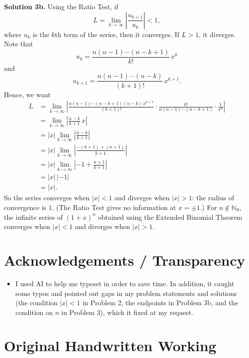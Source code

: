 \documentclass{article}
\begin{document}
\noindent\textbf{Solution 3b.} Using the Ratio Test, if
\[
    L = \lim_{k \to \infty} \left| \frac{u_{k+1}}{u_k} \right| < 1,
\]
where $u_k$ is the $k$th term of the series, then it converges. If $L > 1$, it diverges. Note that
\[
    u_k = \frac{n(n-1)\cdots(n-k+1)}{k!}\, x^k
\]
and
\[
    u_{k+1} = \frac{n(n-1)\cdots(n-k)}{(k+1)!}\, x^{k+1}.
\]
Hence, we want
\begin{align*}
    L &= \lim_{k \to \infty} \left| \frac{n(n-1)\cdots(n-k+1)(n-k)\, x^{k+1}}{(k+1)!} \cdot \frac{k!}{n(n-1)\cdots(n-k+1)} \cdot \frac{1}{x^k} \right| \\
      &= \lim_{k \to \infty} \left| \frac{n-k}{k+1}\, x \right| \\
      &= |x| \lim_{k \to \infty} \left| \frac{n-k}{k+1} \right| \\
      &= |x| \lim_{k \to \infty} \left| \frac{-(k+1) + (n+1)}{k+1} \right| \\
      &= |x| \lim_{k \to \infty} \left| -1 + \frac{n+1}{k+1} \right| \\
      &= |x|\,|-1| \\
      &= |x|.
\end{align*}
So the series converges when $|x| < 1$ and diverges when $|x| > 1$: the radius of convergence is $\boxed{1}$. (The Ratio Test gives no information at $x = \pm 1$.) For $n \notin \mathbb{N}_0$, the infinite series of $(1+x)^n$ obtained using the Extended Binomial Theorem converges when $|x| < 1$ and diverges when $|x| > 1$.

\section*{Acknowledgements / Transparency}

\begin{itemize}
    \item I used AI to help me typeset in order to save time. In addition, it caught some typos and pointed out gaps in my problem statements and solutions (the condition $|x| < 1$ in Problem 2, the endpoints in Problem 3b, and the condition on $n$ in Problem 3), which it fixed at my request.
\end{itemize}

\clearpage
\appendix

\section{Original Handwritten Working}
\end{document}
